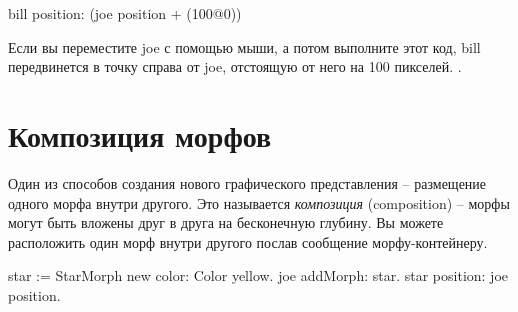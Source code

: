 \documentclass[a4paper,10pt,twoside]{book}
\begin{document}
\begin{code}{}
bill position: (joe position + (100@0))
\end{code}
\noindent
Если вы переместите joe с помощью мыши, а потом выполните этот код, bill передвинется в точку справа от joe, отстоящую от него на 100 пикселей. 
.

\section{Композиция морфов}

Один из способов создания нового графического представления -- размещение одного морфа внутри другого.
Это называется \emph{композиция} (composition) -- морфы могут быть вложены друг в друга на бесконечную глубину.
%
Вы можете расположить один морф внутри другого послав сообщение  морфу-контейнеру.

\begin{code}{}
star := StarMorph new color: Color yellow.
joe addMorph: star.
star position: joe position.
\end{code}
\end{document}
